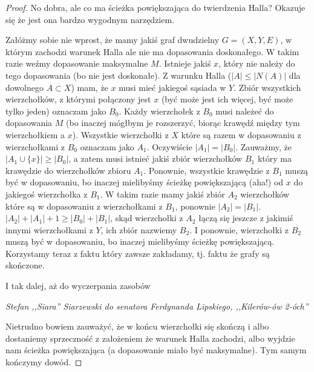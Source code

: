\begin{proof}
	No dobra, ale co ma ścieżka powiększająca do twierdzenia Halla? Okazuje się że jest ona bardzo wygodnym narzędziem.

	Załóżmy sobie nie wprost, że mamy jakiś graf dwudzielny \(G = (X,Y,E)\), w którym zachodzi warunek Halla ale nie ma dopasowania doskonałego. W takim razie weźmy dopasowanie maksymalne \(M\). Istnieje jakiś \(x\), który nie należy do tego dopasowania (bo nie jest doskonałe). Z warunku Halla (\(|A| \leq |N(A)|\) dla dowolnego \(A \subset X\)) mam, że \(x\) musi mieć jakiegoś sąsiada w \(Y\). Zbiór wszystkich wierzchołków, z którymi połączony jest \(x\) (być może jest ich więcej, być może tylko jeden) oznaczam jako \(B_0\). Każdy wierzchołek z \(B_0\) musi należeć do dopasowania \(M\) (bo inaczej mógłbym je rozszerzyć, biorąc krawędź między tym wierzchołkiem a \(x\)). Wszystkie wierzchołki z \(X\) które są razem w dopasowaniu z wierzchołkami z \(B_0\) oznaczam jako \(A_1\). Oczywiście \(|A_1| = |B_0|\). Zauważmy, że \(|A_1 \cup \{x\}| \geq |B_0|\), a zatem musi istnieć jakiś zbiór wierzchołków \(B_1\) który ma krawędzie do wierzchołków zbioru \(A_1\). Ponownie, wszystkie krawędzie z \(B_1\) muszą być w dopasowaniu, bo inaczej mielibyśmy ścieżkę powiększającą (aha!) od \(x\) do jakiegoś wierzchołka z \(B_1\). W takim razie mamy jakiś zbiór \(A_2\) wierzchołków które są w dopasowaniu z wierzchołkami z \(B_1\), ponownie \(|A_2| = |B_1|\). \(|A_2| + |A_1| + 1 \geq |B_0| + |B_1|\), skąd wierzchołki z \(A_2\) łączą się jeszcze z jakimiś innymi wierzchołkami z \(Y\), ich zbiór nazwiemy \(B_2\). I ponownie, wierzchołki z \(B_2\) muszą być w dopasowaniu, bo inaczej mielibyśmy ścieżkę powiększającą. Korzystamy teraz z faktu który zawsze zakładamy, tj. faktu że grafy są skończone.

	\epigraph{I tak dalej, aż do wyczerpania zasobów}{\textit{Stefan ,,Siara'' Siarzewski do senatora Ferdynanda Lipskiego, ,,Kilerów-ów 2-óch''}}

	Nietrudno bowiem zauważyć, że w końcu wierzchołki się skończą i albo dostaniemy sprzeczność z założeniem że warunek Halla zachodzi, albo wyjdzie nam ścieżka powiększająca (a dopasowanie miało być maksymalne). Tym samym kończymy dowód.
\end{proof}
